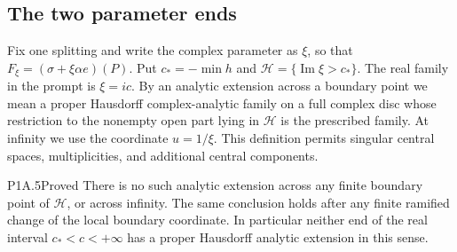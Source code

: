 \subsection{The two parameter ends}

Fix one splitting and write the complex parameter as $\xi$, so that
$F_\xi=(\sigma+\xi\alpha e)(P)$. Put
$c_*=-\min h$ and $\mathcal H=\{\operatorname{Im}\xi>c_*\}$.
The real family in the prompt is $\xi=ic$.
By an analytic extension across a boundary point we mean a proper
Hausdorff complex-analytic family on a full complex disc whose
restriction to the nonempty open part lying in $\mathcal H$ is
the prescribed family. At infinity we use the coordinate $u=1/\xi$.
This definition permits singular central spaces, multiplicities,
and additional central components.

\begin{statement}{P1A.5}{Proved}
There is no such analytic extension across any finite boundary
point of $\mathcal H$, or across infinity. The same conclusion
holds after any finite ramified change of the local boundary
coordinate. In particular neither end of the real interval
$c_*<c<+\infty$ has a proper Hausdorff analytic extension in
this sense.
\end{statement}
